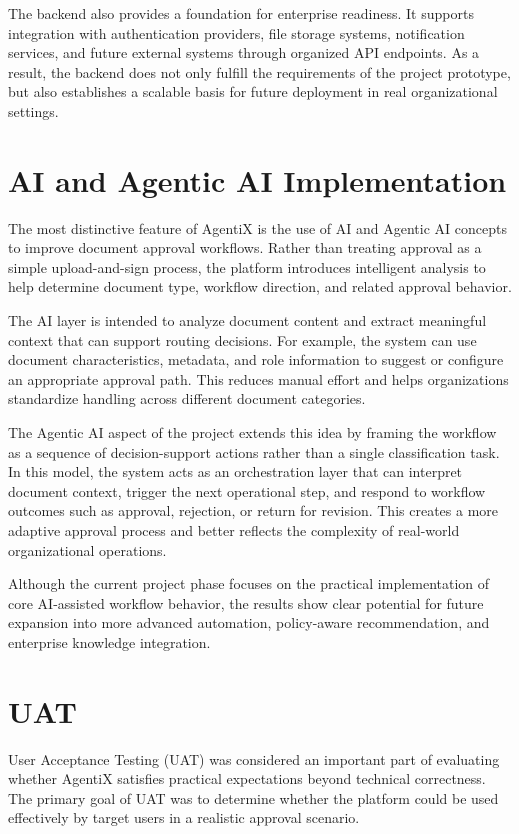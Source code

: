 \documentclass[12pt,oneside,openright,a4paper]{cpe-english-project}
\begin{document}
The backend also provides a foundation for enterprise readiness. It supports integration with authentication providers, file storage systems, notification services, and future external systems through organized API endpoints. As a result, the backend does not only fulfill the requirements of the project prototype, but also establishes a scalable basis for future deployment in real organizational settings.

\section{AI and Agentic AI Implementation}

The most distinctive feature of AgentiX is the use of AI and Agentic AI concepts to improve document approval workflows. Rather than treating approval as a simple upload-and-sign process, the platform introduces intelligent analysis to help determine document type, workflow direction, and related approval behavior.

The AI layer is intended to analyze document content and extract meaningful context that can support routing decisions. For example, the system can use document characteristics, metadata, and role information to suggest or configure an appropriate approval path. This reduces manual effort and helps organizations standardize handling across different document categories.

The Agentic AI aspect of the project extends this idea by framing the workflow as a sequence of decision-support actions rather than a single classification task. In this model, the system acts as an orchestration layer that can interpret document context, trigger the next operational step, and respond to workflow outcomes such as approval, rejection, or return for revision. This creates a more adaptive approval process and better reflects the complexity of real-world organizational operations.

Although the current project phase focuses on the practical implementation of core AI-assisted workflow behavior, the results show clear potential for future expansion into more advanced automation, policy-aware recommendation, and enterprise knowledge integration.

\section{UAT}

User Acceptance Testing (UAT) was considered an important part of evaluating whether AgentiX satisfies practical expectations beyond technical correctness. The primary goal of UAT was to determine whether the platform could be used effectively by target users in a realistic approval scenario.
\end{document}
